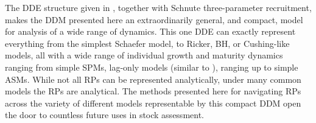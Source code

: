 
%
The DDE structure given in \cite{walters_continuous_2020, deriso_harvesting_1980, schnute_general_1985}, 
together with Schnute three-parameter recruitment, makes the DDM presented 
here an extraordinarily general, and compact, model for analysis of a wide 
range of dynamics. This one DDE can exactly represent everything from the 
simplest Schaefer model, to Ricker, BH, or Cushing-like models, all with a 
wide range of individual growth and maturity dynamics ranging from simple SPMs, 
lag-only models (similar to \cite{dick_depletion-based_2011}), ranging up to 
simple ASMs. While not all RPs can be represented analytically, under many 
common models the RPs are analytical. The methods presented here for navigating RPs
across the variety of different models representable by this compact DDM
open the door to countless future uses in stock assessment. 



